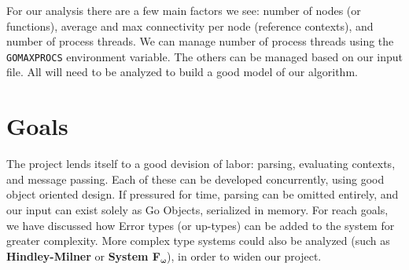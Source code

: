 \documentclass{article}[9pt]
\begin{document}
\begin{multicols}{2}
For our analysis there are a few main factors we see: number of nodes
(or functions), average and max connectivity per node (reference
contexts), and number of process threads. We can manage number of
process threads using the \texttt{GOMAXPROCS} environment
variable. The others can be managed based on our input file. All will
need to be analyzed to build a good model of our algorithm.

\section*{Goals}
The project lends itself to a good devision of labor: parsing,
evaluating contexts, and message passing. Each of these can be
developed concurrently, using good object oriented design. If pressured
for time, parsing can be omitted entirely, and our input can exist
solely as Go Objects, serialized in memory. For reach goals, we have
discussed how Error types (or up-types) can be added to the system for
greater complexity. More complex type systems could also be analyzed
(such as \textbf{Hindley-Milner} or \textbf{System F$_\mathbf{\omega}$}), in order to widen our
project.
\end{multicols}
\end{document}
